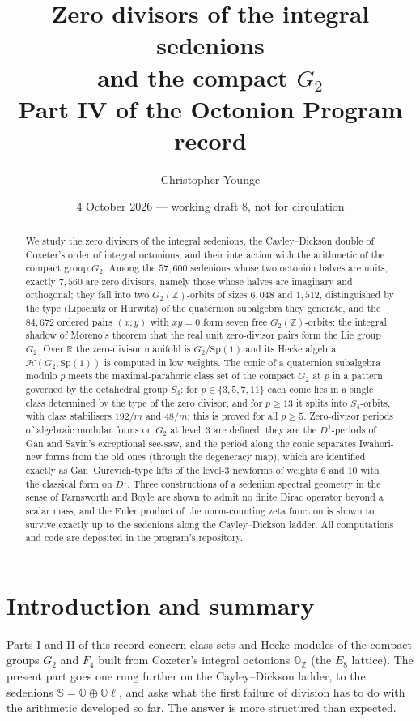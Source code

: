 \documentclass[11pt]{amsart}
\title[Zero divisors of the integral sedenions]{Zero divisors of the integral sedenions\\ and the compact $G_2$\\[4pt] {\normalsize Part IV of the Octonion Program record}}
\author{Christopher Younge}
\date{4 October 2026 --- working draft 8, not for circulation}
\theoremstyle{definition}
\renewcommand{\O}{\mathbb{O}}\newcommand{\Sd}{\mathbb{S}}\newcommand{\Hq}{\mathbb{H}}\newcommand{\Z}{\mathbb{Z}}\newcommand{\Q}{\mathbb{Q}}\newcommand{\R}{\mathbb{R}}\newcommand{\C}{\mathbb{C}}\newcommand{\F}{\mathbb{F}}
\begin{document}
\begin{abstract}
We study the zero divisors of the integral sedenions, the Cayley--Dickson double of Coxeter's order of integral octonions, and their interaction with the arithmetic of the compact group $G_2$. Among the $57{,}600$ sedenions whose two octonion halves are units, exactly $7{,}560$ are zero divisors, namely those whose halves are imaginary and orthogonal; they fall into two $G_2(\Z)$-orbits of sizes $6{,}048$ and $1{,}512$, distinguished by the type (Lipschitz or Hurwitz) of the quaternion subalgebra they generate, and the $84{,}672$ ordered pairs $(x,y)$ with $xy=0$ form seven free $G_2(\Z)$-orbits: the integral shadow of Moreno's theorem that the real unit zero-divisor pairs form the Lie group $G_2$. Over $\R$ the zero-divisor manifold is $G_2/\mathrm{Sp}(1)$ and its Hecke algebra $\mathcal H(G_2,\mathrm{Sp}(1))$ is computed in low weights. The conic of a quaternion subalgebra modulo $p$ meets the maximal-parahoric class set of the compact $G_2$ at $p$ in a pattern governed by the octahedral group $S_4$: for $p\in\{3,5,7,11\}$ each conic lies in a single class determined by the type of the zero divisor, and for $p\ge 13$ it splits into $S_4$-orbits, with class stabilisers $192/m$ and $48/m$; this is proved for all $p\ge 5$. Zero-divisor periods of algebraic modular forms on $G_2$ at level~3 are defined; they are the $D^1$-periods of Gan and Savin's exceptional see-saw, and the period along the conic separates Iwahori-new forms from the old ones (through the degeneracy map), which are identified exactly as Gan--Gurevich-type lifts of the level-$3$ newforms of weights $6$ and $10$ with the classical form on $D^1$. Three constructions of a sedenion spectral geometry in the sense of Farnsworth and Boyle are shown to admit no finite Dirac operator beyond a scalar mass, and the Euler product of the norm-counting zeta function is shown to survive exactly up to the sedenions along the Cayley--Dickson ladder. All computations and code are deposited in the program's repository.
\end{abstract}
\maketitle
\tableofcontents

\section{Introduction and summary}
Parts I and II of this record \cite{PartI,PartII} concern class sets and Hecke modules of the compact groups $G_2$ and $F_4$ built from Coxeter's integral octonions $\O_\Z$ (the $E_8$ lattice). The present part goes one rung further on the Cayley--Dickson ladder, to the sedenions $\Sd=\O\oplus\O\ell$, and asks what the first failure of division has to do with the arithmetic developed so far. The answer is more structured than expected.
\end{document}
